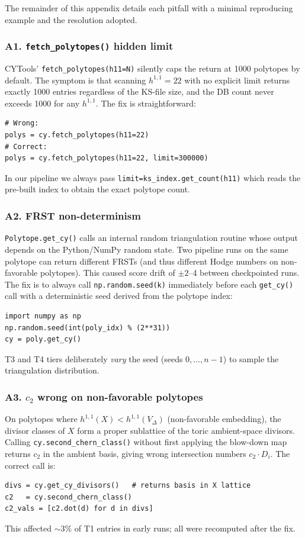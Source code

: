 \documentclass[11pt,a4paper]{article}
\begin{document}
The remainder of this appendix details each pitfall with a
minimal reproducing example and the resolution adopted.

\subsubsection*{A1. \texttt{fetch\_polytopes()} hidden limit}

CYTools' \texttt{fetch\_polytopes(h11=N)} silently caps the return
at 1000 polytopes by default.
The symptom is that scanning $h^{1,1}=22$ with no explicit limit
returns exactly 1000 entries regardless of the KS-file size,
and the DB count never exceeds 1000 for any $h^{1,1}$.
The fix is straightforward:
\begin{verbatim}
# Wrong:
polys = cy.fetch_polytopes(h11=22)
# Correct:
polys = cy.fetch_polytopes(h11=22, limit=300000)
\end{verbatim}
In our pipeline we always pass
\texttt{limit=ks\_index.get\_count(h11)} which reads the pre-built
index to obtain the exact polytope count.

\subsubsection*{A2. FRST non-determinism}

\texttt{Polytope.get\_cy()} calls an internal random triangulation
routine whose output depends on the Python/NumPy random state.
Two pipeline runs on the same polytope can return different FRSTs
(and thus different Hodge numbers on non-favorable polytopes).
This caused score drift of $\pm 2$--4 between checkpointed runs.
The fix is to always call \texttt{np.random.seed(k)} immediately
before each \texttt{get\_cy()} call with a deterministic seed derived
from the polytope index:
\begin{verbatim}
import numpy as np
np.random.seed(int(poly_idx) % (2**31))
cy = poly.get_cy()
\end{verbatim}
T3 and T4 tiers deliberately \emph{vary} the seed (seeds $0,\ldots,n-1$)
to sample the triangulation distribution.

\subsubsection*{A3. $c_2$ wrong on non-favorable polytopes}

On polytopes where $h^{1,1}(X) < h^{1,1}(V_\Delta)$ (non-favorable
embedding), the divisor classes of $X$ form a proper sublattice of
the toric ambient-space divisors.
Calling \texttt{cy.second\_chern\_class()} without first applying the
blow-down map returns $c_2$ in the ambient basis, giving wrong
intersection numbers $c_2\cdot D_i$.
The correct call is:
\begin{verbatim}
divs = cy.get_cy_divisors()   # returns basis in X lattice
c2   = cy.second_chern_class()
c2_vals = [c2.dot(d) for d in divs]
\end{verbatim}
This affected $\sim 3\%$ of T1 entries in early runs; all were
recomputed after the fix.
\end{document}
